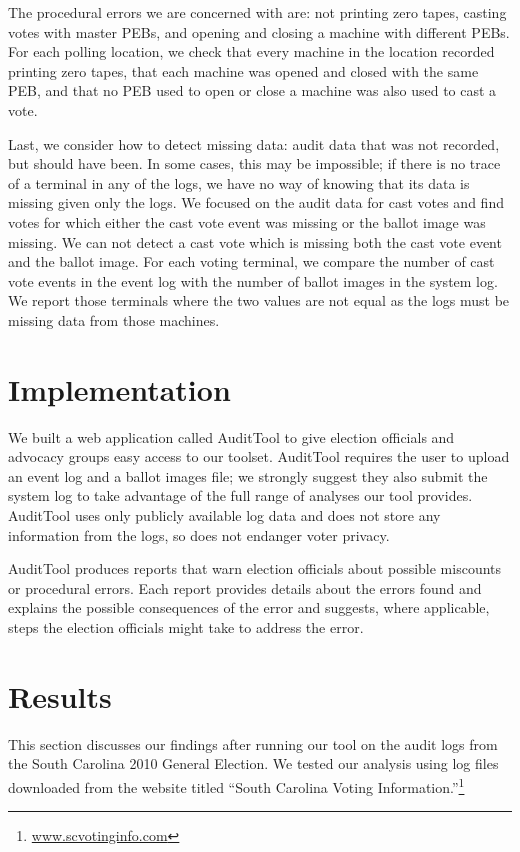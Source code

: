 \documentclass[letterpaper,twocolumn,10pt]{article}
\begin{document}
The procedural errors we are concerned with are: not printing zero tapes,
casting votes with master PEBs, and opening and closing a machine with
different PEBs. For each polling location, we check that every machine in the
location recorded printing zero tapes, that each machine was opened and closed
with the same PEB, and that no PEB used to open or close a machine was also used
to cast a vote.  

Last, we consider how to detect missing data: audit data that was not recorded,
but should have been. In some cases, this may be impossible; if there is no
trace of a terminal in any of the logs, we have no way of knowing that its data
is missing given only the logs. We focused on the audit data for cast votes and
find votes for which either the cast vote event was missing or the ballot image
was missing. We can not detect a cast vote which is missing both the cast vote
event and the ballot image. For each voting terminal, we compare the number of
cast vote events in the event log with the number of ballot images in the system
log. We report those terminals where the two values are not equal as the logs
must be missing data from those machines.  

\section{Implementation}
We built a web application called AuditTool to give election officials and
advocacy groups easy access to our toolset. AuditTool requires the user to
upload an event log and a ballot images file; we strongly suggest they also
submit the system log to take advantage of the full range of analyses our tool
provides. AuditTool uses only publicly available log data and does not store
any information from the logs, so does not endanger voter privacy.  

AuditTool produces reports that warn election officials about possible miscounts
or procedural errors. Each report provides details about the errors found and
explains the possible consequences of the error and suggests, where applicable,
steps the election officials might take to address the error.

\section{Results}
This section discusses our findings after running our tool on the audit logs
from the South Carolina 2010 General Election. We tested our analysis using log
files downloaded from the website titled “South Carolina Voting
Information.”\footnote{\url{www.scvotinginfo.com}} 
\end{document}
